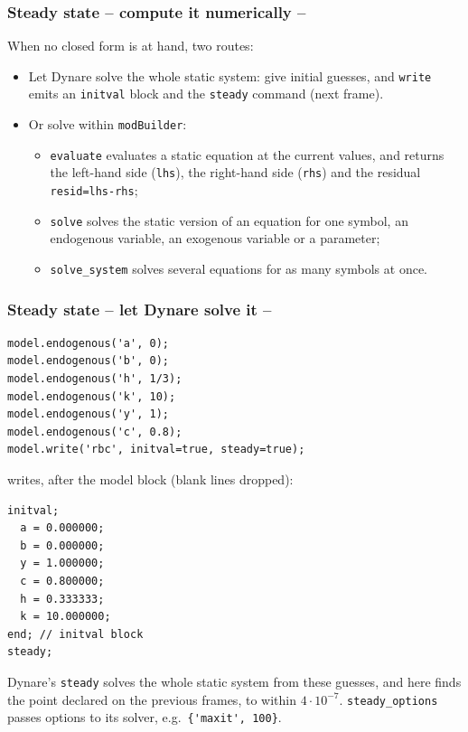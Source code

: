 \documentclass[10pt,slidestop]{beamer}
\theoremstyle{plain}
\begin{document}
\begin{frame}[c,fragile]
  \frametitle{Steady state -- compute it numerically --}

  When no closed form is at hand, two routes:

  \begin{itemize}

  \item Let Dynare solve the whole static system: give initial guesses, and
    \verb+write+ emits an \verb+initval+ block and the \verb+steady+ command (next
    frame).\newline

  \item Or solve within \verb+modBuilder+:
    \begin{itemize}
    \item[--] \verb+evaluate+ evaluates a static equation at the current values, and
      returns the left-hand side (\verb+lhs+), the right-hand side (\verb+rhs+) and
      the residual \verb+resid=lhs-rhs+;
    \item[--] \verb+solve+ solves the static version of an equation for one symbol,
      an endogenous variable, an exogenous variable or a parameter;
    \item[--] \verb+solve_system+ solves several equations for as many symbols at
      once.
    \end{itemize}

  \end{itemize}

\end{frame}


\begin{frame}[fragile]
  \frametitle{Steady state -- let Dynare solve it --}

  \begin{lstlisting}[style=MatlabConsole,basicstyle=\ttfamily\scriptsize]
% initial guesses, one per endogenous variable
model.endogenous('a', 0);
model.endogenous('b', 0);
model.endogenous('h', 1/3);
model.endogenous('k', 10);
model.endogenous('y', 1);
model.endogenous('c', 0.8);
model.write('rbc', initval=true, steady=true);
  \end{lstlisting}

  \small writes, after the model block (blank lines dropped):

  \begin{lstlisting}[language=Dynare,basicstyle=\scriptsize\ttfamily,numbers=none]
initval;
  a = 0.000000;
  b = 0.000000;
  y = 1.000000;
  c = 0.800000;
  h = 0.333333;
  k = 10.000000;
end; // initval block
steady;
  \end{lstlisting}

  Dynare's \verb+steady+ solves the whole static system from these guesses, and here
  finds the point declared on the previous frames, to within $4\cdot 10^{-7}$.
  \verb+steady_options+ passes options to its solver, e.g.\ \verb+{'maxit', 100}+.

\end{frame}
\end{document}
